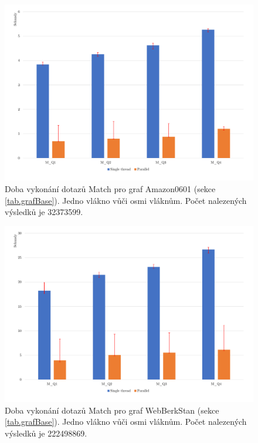\begin{figure}[!htp]
\includegraphics[width=\linewidth]{../img/amazonMatch.pdf}\centering
\caption{Doba vykonání dotazů Match pro graf Amazon0601 (sekce \ref{tab.grafBase}). Jedno vlákno vůči osmi vláknům. Počet nalezených výsledků je 32373599.}
\label{figure.amazonMatch}
\end{figure}

\begin{figure}[!htp]
\includegraphics[width=\linewidth]{../img/webberkstanMatch.pdf}\centering
\caption{Doba vykonání dotazů Match pro graf WebBerkStan (sekce \ref{tab.grafBase}). Jedno vlákno vůči osmi vláknům. Počet nalezených výsledků je 222498869.}
\label{figure.webberkstanMatch}
\end{figure}

